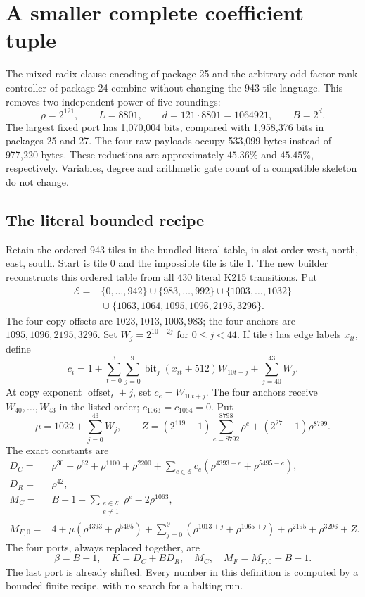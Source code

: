 \section{A smaller complete coefficient tuple}
\label{sec:new-coefficients}

The mixed-radix clause encoding of package 25 and the arbitrary-odd-factor
rank controller of package 24 combine without changing the 943-tile
language.  This removes two independent power-of-five roundings:
\[
 \rho=2^{121},\qquad L=8801,\qquad
 d=121\cdot8801=1064921,\qquad B=2^d.
\]
The largest fixed port has 1,070,004 bits, compared with 1,958,376 bits
in packages 25 and 27.  The four raw payloads occupy 533,099 bytes instead
of 977,220 bytes.  These reductions are approximately $45.36\%$ and
$45.45\%$, respectively.  Variables, degree and arithmetic gate count of
a compatible skeleton do not change.

\subsection{The literal bounded recipe}

Retain the ordered 943 tiles in the bundled literal table, in slot order
west, north, east, south.  Start is tile 0 and the impossible tile is
tile 1.  The new builder reconstructs this ordered table from all 430
literal K215 transitions.  Put
\begin{align*}
 \mathcal E={}&\{0,\ldots,942\}\cup\{983,\ldots,992\}
               \cup\{1003,\ldots,1032\}\\
 &{}\cup\{1063,1064,1095,1096,2195,3296\}.
\end{align*}
The four copy offsets are $1023,1013,1003,983$; the four anchors are
$1095,1096,2195,3296$.  Set $W_j=2^{10+2j}$ for $0\le j<44$.
If tile $i$ has edge labels $x_{it}$, define
\[
 c_i=1+\sum_{t=0}^3\sum_{j=0}^9
       \operatorname{bit}_j(x_{it}+512)W_{10t+j}
       +\sum_{j=40}^{43}W_j.
\]
At copy exponent $\operatorname{offset}_t+j$, set $c_e=W_{10t+j}$.
The four anchors receive $W_{40},\ldots,W_{43}$ in the listed order;
$c_{1063}=c_{1064}=0$.  Put
\[
 \mu=1022+\sum_{j=0}^{43}W_j,\qquad
 Z=(2^{119}-1)\sum_{e=8792}^{8798}\rho^e
       +(2^{27}-1)\rho^{8799}.
\]
The exact constants are
\begin{align*}
 D_C={}&\rho^{30}+\rho^{62}+\rho^{1100}+\rho^{2200}
       +\sum_{e\in\mathcal E}c_e
            (\rho^{4393-e}+\rho^{5495-e}),\\
 D_R={}&\rho^{42},\\
 M_C={}&B-1-\sum_{\substack{e\in\mathcal E\\e\ne1}}\rho^e
                -2\rho^{1063},\\
 M_{F,0}={}&4+\mu(\rho^{4393}+\rho^{5495})
       +\sum_{j=0}^{9}(\rho^{1013+j}+\rho^{1065+j})
       +\rho^{2195}+\rho^{3296}+Z.
\end{align*}
The four ports, always replaced together, are
\begin{equation}\label{eq:new-four-ports}
 \boxed{\ \beta=B-1,\quad K=D_C+BD_R,\quad
 M_C,\quad M_F=M_{F,0}+B-1.\ }
\end{equation}
The last port is already shifted.  Every number in this definition is
computed by a bounded finite recipe, with no search for a halting run.

